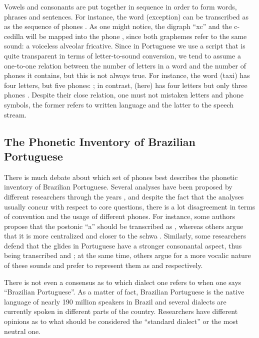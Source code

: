 Vowels and consonants are put together in sequence in order to form words, phrases and sentences. For instance, the word  (exception) can be transcribed as as the sequence of phones \ipa{[e.se's\~a\~U]}. As one might notice, the digraph ``xc'' and the c-cedilla will be mapped into the phone \ipa{[s]}, since both graphemes refer to the same sound: a voiceless alveolar fricative. Since in Portuguese we use a script that is quite transparent in terms of letter-to-sound conversion, we tend to assume a one-to-one relation between the number of letters in a word and the number of phones it contains, but this is not always true. For instance, the word  (taxi) has four letters, but five phones: \ipa{['tak.sI]}; in contrast,  (here) has four letters but only three phones \ipa{[a'ki]}. Despite their close relation, one must not mistaken letters and phone symbols, the former refers to written language and the latter to the speech stream.

\clearpage
\subsection{The Phonetic Inventory of Brazilian Portuguese} 

There is much debate about which set of phones best describes the phonetic inventory of Brazilian Portuguese. Several analyses have been proposed by different researchers through the years \cite{Bisol2005, Cagliari2002, Camara1970, Cristofaro2005, Neves1999}, and despite the fact that the analyses usually concur with respect to core questions, there is a lot disagreement in terms of convention and the usage of different phones.  For instance, some authors propose that the postonic ``a'' should be transcribed as \ipa{[5]}, whereas others argue that it is more centralized and closer to the schwa \ipa{[@]}. Similarly, some researchers defend that the glides in Portuguese have a stronger consonantal aspect, thus being transcribed \ipa{[w]} and \ipa{[j]}; at the same time, others argue for a more vocalic nature of these sounds and prefer to represent them as \ipa{[\textsubarch{U}]} and \ipa{[\textsubarch{I}]} respectively. 

There is not even a consensus as to which dialect one refers to when one says ``Brazilian Portuguese''. As a matter of fact, Brazilian Portuguese is the native language of nearly 190 million speakers in Brazil \cite{Ethnologue2005} and several dialects are currently spoken in different parts of the country. Researchers have different opinions as to what should be considered the ``standard dialect'' or the most neutral one.


